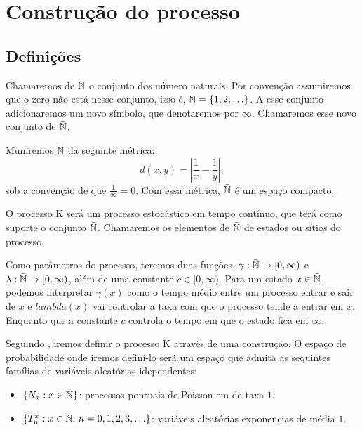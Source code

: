 \chapter{Construção do processo}
\label{cap:construcao}

\section{Definições}
\label{sec:definicoes}

Chamaremos de ${\mathbb{N}}$ o conjunto dos número naturais. Por convenção
assumiremos que o zero não está nesse conjunto, isso é, ${\mathbb{N}} = \{ 1, 2,
\ldots \}$. A esse conjunto adicionaremos um novo símbolo, que
denotaremos por $\infty$. Chamaremos esse novo conjunto de ${\bar{{\mathbb{N}}}}$.

Muniremos ${\bar{{\mathbb{N}}}}$ da seguinte métrica:
\begin{equation}
  \label{eq:metrica}
  d(x, y) = \left\lvert \frac{1}{x} - \frac{1}{y} \right\rvert,
\end{equation}
sob a convenção de que $\frac{1}{\infty} = 0$. Com essa métrica,
${\bar{{\mathbb{N}}}}$ é um espaço compacto. 

O processo K será um processo estocástico em tempo contínuo, que terá
como suporte o conjunto ${\bar{{\mathbb{N}}}}$. Chamaremos os elementos de ${\bar{{\mathbb{N}}}}$ de
estados ou sítios do processo.

Como parâmetros do processo, teremos duas funções,
 $\gamma: {\bar{{\mathbb{N}}}} \to [0, \infty)$ e $\lambda: {\bar{{\mathbb{N}}}} \to [0, \infty)$,
além de uma constante $c \in [0, \infty)$.
Para um estado $x \in {\bar{{\mathbb{N}}}}$, podemos interpretar $\gamma(x)$ como
o tempo médio entre um processo entrar e sair de $x$ e $lambda(x)$
vai controlar a taxa com que o processo tende a entrar em
$x$. Enquanto que a constante $c$ controla o tempo em que o estado
fica em $\infty$.

Seguindo \cite{fontes:08k}, iremos definir o processo K através de uma
construção. O espaço de probabilidade onde iremos definí-lo será um
espaço que admita as sequintes famílias de variáveis aleatórias
idependentes:

\begin{itemize}
  \item $\{ N_x: x \in {\mathbb{N}} \}$: processos pontuais de Poisson em de taxa
    $1$.
  \item $\{T_n^x: x \in {\mathbb{N}} , \, n = 0, 1, 2, 3, \ldots \}$:
    variáveis aleatórias exponencias de média $1$.
\end{itemize}


